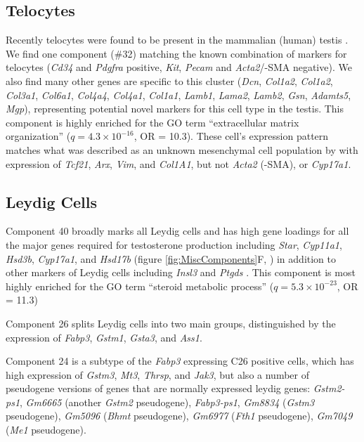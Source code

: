 \subsection{Telocytes}
Recently telocytes were found to be present in the mammalian (human) testis \parencite{Marini2018Reappraising, Kuroda2004Distribution}. We find one component (\#32) matching the known combination of markers for telocytes (\textit{Cd34} and \textit{Pdgfra} positive, \textit{Kit}, \textit{Pecam} and \textit{Acta2}/\textalpha-SMA negative). We also find many other genes are specific to this cluster (\textit{Dcn}, \textit{Col1a2}, \textit{Col1a2}, \textit{Col3a1}, \textit{Col6a1}, \textit{Col4a4}, \textit{Col4a1}, \textit{Col1a1}, \textit{Lamb1}, \textit{Lama2}, \textit{Lamb2}, \textit{Gsn}, \textit{Adamts5}, \textit{Mgp}), representing potential novel markers for this cell type in the testis. This component is highly enriched for the GO term ``extracellular matrix organization'' ($q = 4.3\times10^{-16}$, OR = 10.3). These cell's expression pattern matches what was described as an unknown mesenchymal cell population by \cite{Green2018Comprehensive} with expression of \textit{Tcf21}, \textit{Arx}, \textit{Vim}, and \textit{Col1A1}, but not \textit{Acta2} (\textalpha-SMA), or \textit{Cyp17a1}.


\subsection{Leydig Cells}
Component 40 broadly marks all Leydig cells and has high gene loadings for all the major genes required for testosterone production including \textit{Star}, \textit{Cyp11a1}, \textit{Hsd3b}, \textit{Cyp17a1}, and \textit{Hsd17b} (figure \ref{fig:MiscComponents}F, \cite{Stojkov2013Orally}) in addition to other markers of Leydig cells including \textit{Insl3} and \textit{Ptgds} \parencite{Balvers1998RelaxinLike, Baker2001Expression}. This component is most highly enriched for the GO term ``steroid metabolic process'' ($q = 5.3\times10^{-23}$, OR = 11.3)

Component 26 splits Leydig cells into two main groups, distinguished by the expression of \textit{Fabp3}, \textit{Gstm1}, \textit{Gsta3}, and \textit{Ass1}.

Component 24 is a subtype of the \textit{Fabp3} expressing C26 positive cells, which has high expression of \textit{Gstm3}, \textit{Mt3}, \textit{Thrsp}, and \textit{Jak3}, but also a number of pseudogene versions of genes that are normally expressed leydig genes: \textit{Gstm2-ps1}, \textit{Gm6665} (another \textit{Gstm2} pseudogene), \textit{Fabp3-ps1}, \textit{Gm8834} (\textit{Gstm3} pseudogene), \textit{Gm5096} (\textit{Bhmt} pseudogene), \textit{Gm6977} (\textit{Fth1} pseudogene), \textit{Gm7049} (\textit{Me1} pseudogene).

